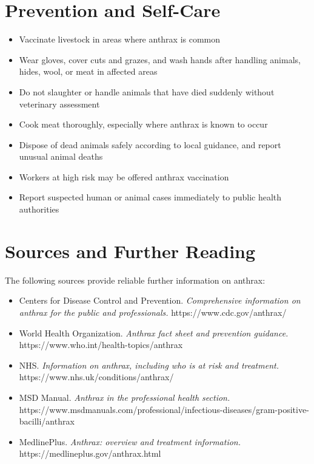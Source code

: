 \section*{Prevention and Self-Care}
\begin{itemize}
    \item Vaccinate livestock in areas where anthrax is common
    \item Wear gloves, cover cuts and grazes, and wash hands after handling animals, hides, wool, or meat in affected areas
    \item Do not slaughter or handle animals that have died suddenly without veterinary assessment
    \item Cook meat thoroughly, especially where anthrax is known to occur
    \item Dispose of dead animals safely according to local guidance, and report unusual animal deaths
    \item Workers at high risk may be offered anthrax vaccination
    \item Report suspected human or animal cases immediately to public health authorities
\end{itemize}

\section*{Sources and Further Reading}
The following sources provide reliable further information on anthrax:

\begin{itemize}
    \item Centers for Disease Control and Prevention. \textit{Comprehensive information on anthrax for the public and professionals.} https://www.cdc.gov/anthrax/
    \item World Health Organization. \textit{Anthrax fact sheet and prevention guidance.} https://www.who.int/health-topics/anthrax
    \item NHS. \textit{Information on anthrax, including who is at risk and treatment.} https://www.nhs.uk/conditions/anthrax/
    \item MSD Manual. \textit{Anthrax in the professional health section.} https://www.msdmanuals.com/professional/infectious-diseases/gram-positive-bacilli/anthrax
    \item MedlinePlus. \textit{Anthrax: overview and treatment information.} https://medlineplus.gov/anthrax.html
\end{itemize}
